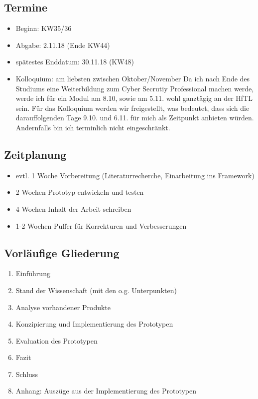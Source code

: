     \subsection*{Termine}
        \begin{itemize}
            \item Beginn: KW35/36
            \item Abgabe: 2.11.18 (Ende KW44)
            \item spätestes Enddatum: 30.11.18 (KW48)
            \item Kolloquium: am liebsten zwischen Oktober/November 
            Da ich nach Ende des Studiums eine Weiterbildung zum Cyber Secrutiy Professional machen werde, werde ich für ein Modul am 8.10, sowie am 5.11. wohl ganztägig an der HfTL sein. Für das Kolloquium werden wir freigestellt, was bedeutet, dass sich die darauffolgenden Tage 9.10. und 6.11. für mich als Zeitpunkt anbieten würden. Andernfalls bin ich terminlich nicht eingeschränkt.
        \end{itemize}

    \subsection*{Zeitplanung}
        \begin{itemize}
            \item evtl. 1 Woche Vorbereitung (Literaturrecherche, Einarbeitung ins Framework)
            \item 2 Wochen Prototyp entwickeln und testen
            \item 4 Wochen Inhalt der Arbeit schreiben
            \item 1-2 Wochen Puffer für Korrekturen und Verbesserungen
        \end{itemize}

    \subsection*{Vorläufige Gliederung}
        \begin{enumerate}
            \item Einführung
            \item Stand der Wissenschaft (mit den o.g. Unterpunkten)
            \item Analyse vorhandener Produkte
            \item Konzipierung und Implementierung des Prototypen
            \item Evaluation des Prototypen
            \item Fazit
            \item Schluss
            \item Anhang: Auszüge aus der Implementierung des Prototypen
        \end{enumerate}


\nocite{*}